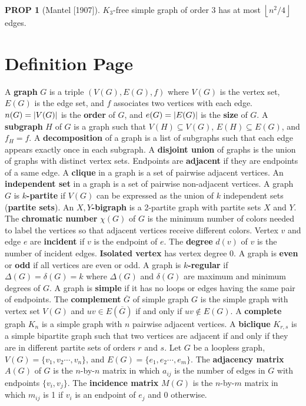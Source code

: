 \documentclass[11pt]{article}
\theoremstyle{definition}
\theoremstyle{dotles}
\theoremstyle{dotless}
\newtheorem{proposition}{PROP}[section]
\theoremstyle{remark}
\begin{document}
\begin{proposition}[Mantel [{1907]}]
$K_3$-free simple graph of order 3 has at most $\left\lfloor n^2/4\right\rfloor$ edges.
\end{proposition}



\newpage\appendix
\section*{Definition Page}
A \textbf{graph} $G$ is a triple $(V(G),E(G),f)$ where $V(G)$ is the vertex set, $E(G)$ is the edge set, and $f$ associates two vertices with each edge. $n(G)=\abs{V(G)}$ is the \textbf{order} of $G$, and $e(G)=\abs{E(G)}$ is the \textbf{size} of $G$. A \textbf{subgraph} $H$ of $G$ is a graph such that $V(H)\subseteq V(G)$, $E(H)\subseteq E(G)$, and $f_H=f$. A \textbf{decomposition} of a graph is a list of subgraphs such that each edge appears exactly once in each subgraph. A \textbf{disjoint union} of graphs is the union of graphs with distinct vertex sets.\medbreak
Endpoints are \textbf{adjacent} if they are endpoints of a same edge. A \textbf{clique} in a graph is a set of pairwise adjacent vertices. An \textbf{independent set} in a graph is a set of pairwise non-adjacent vertices. A graph $G$ is \textbf{$k$-partite} if $V(G)$ can be expressed as the union of $k$ independent sets (\textbf{partite sets}). An \textbf{$X,Y$-bigraph} is a 2-partite graph with partite sets $X$ and $Y$. The \textbf{chromatic number} $\chi(G)$ of $G$ is the minimum number of colors needed to label the vertices so that adjacent vertices receive different colors. Vertex $v$ and edge $e$ are \textbf{incident} if $v$ is the endpoint of $e$. The \textbf{degree} $d(v)$ of $v$ is the number of incident edges. \textbf{Isolated vertex} has vertex degree 0. A graph is \textbf{even} or \textbf{odd} if all vertices are even or odd. A graph is \textbf{$k$-regular} if $\Delta(G)=\delta(G)=k$ where $\Delta(G)$ and $\delta(G)$ are maximum and minimum degrees of $G$.\medbreak
A graph is \textbf{simple} if it has no loops or edges having the same pair of endpoints. The \textbf{complement} $\overline{G}$ of simple graph $G$ is the simple graph with vertex set $V(G)$ and $uv\in E(\overline{G})$ if and only if $uv\not\in E(G)$. A \textbf{complete} graph $K_n$ is a simple graph with $n$ pairwise adjacent vertices. A \textbf{biclique} $K_{r,s}$ is a simple bipartite graph such that two vertices are adjacent if and only if they are in different partite sets of orders $r$ and $s$.\medbreak
Let $G$ be a loopless graph, $V(G)=\{v_1,v_2\cdots,v_n\}$, and $E(G)=\{e_1,e_2\cdots,e_m\}$. The \textbf{adjacency matrix} $A(G)$ of $G$ is the $n$-by-$n$ matrix in which $a_{ij}$ is the number of edges in $G$ with endpoints $\{v_i,v_j\}$. The \textbf{incidence matrix} $M(G)$ is the $n$-by-$m$ matrix in which $m_{ij}$ is 1 if $v_i$ is an endpoint of $e_j$ and 0 otherwise.\medbreak
\end{document}
